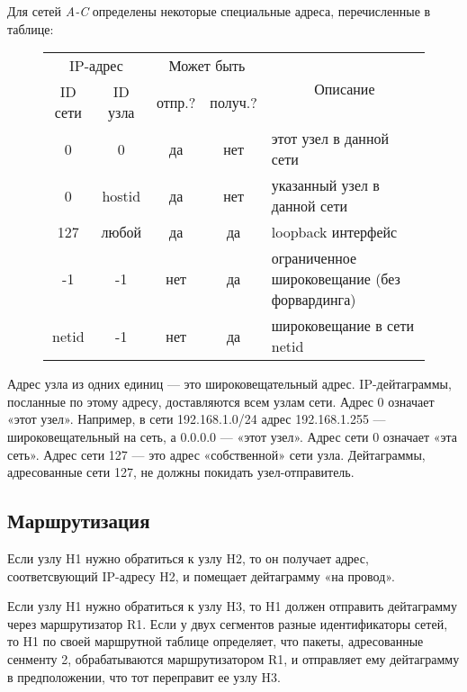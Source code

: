 Для сетей \emph{A-C} определены некоторые специальные адреса, перечисленные в таблице:\
\begin{figure}[h!]
  \centering
  \begin{tabular}{c|c|c|c|p{5cm}}
    \toprule
    \multicolumn{2}{c|}{IP-адрес} & \multicolumn{2}{|c|}{Может быть} & \multicolumn{1}{|c}{\multirow{2}{*}{Описание}} \\
    ID сети & ID узла & отпр.? & получ.? & \\
    \midrule
    0     & 0      & да  & нет & этот узел в данной сети \\
    \midrule
    0     & hostid & да  & нет & указанный узел в данной сети \\
    \midrule
    127   & любой  & да  & да  & loopback интерфейс \\
    \midrule
    -1    & -1     & нет & да  & ограниченное широковещание (без форвардинга) \\
    \midrule
    netid & -1     & нет & да  & широковещание в сети netid \\
    \bottomrule
  \end{tabular}
\end{figure}

Адрес узла из одних единиц — это широковещательный адрес. IP-дейтаграммы, посланные по этому адресу, доставляются всем узлам сети. Адрес 0 означает «этот узел». Например, в сети 192.168.1.0/24 адрес 192.168.1.255 — широковещательный на сеть, а 0.0.0.0 — «этот узел». Адрес сети 0 означает «эта сеть». Адрес сети 127 — это адрес «собственной» сети узла. Дейтаграммы, адресованные сети 127, не должны покидать узел-отправитель.

\subsection{Маршрутизация}

Если узлу H1 нужно обратиться к узлу H2, то он получает адрес, соответсвующий IP-адресу H2, и помещает дейтаграмму «на провод».

Если узлу H1 нужно обратиться к узлу H3, то H1 должен отправить дейтаграмму через маршрутизатор R1. Если у двух сегментов разные идентификаторы сетей, то H1 по своей маршрутной таблице определяет, что пакеты, адресованные сенменту 2, обрабатываются маршрутизатором R1, и отправляет ему дейтаграмму в предположении, что тот переправит ее узлу H3.

